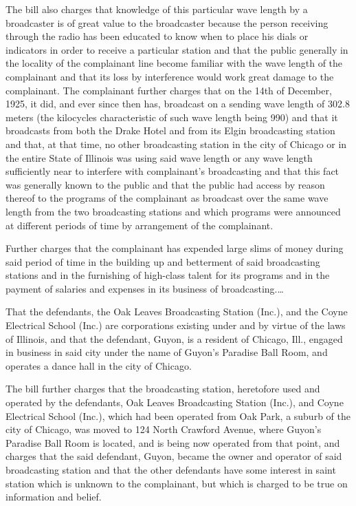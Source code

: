 The bill also charges that knowledge of this particular wave length by a
broadcaster is of great value to the broadcaster because the person receiving
through the radio has been educated to know when to place his dials or
indicators in order to receive a particular station and that the public
generally in the locality of the complainant line become familiar with the wave
length of the complainant and that its loss by interference would work great
damage to the complainant. The complainant further charges that on the 14th of
December, 1925, it did, and ever since then has, broadcast on a sending wave
length of 302.8 meters (the kilocycles characteristic of such wave length being
990) and that it broadcasts from both the Drake Hotel and from its Elgin
broadcasting station and that, at that time, no other broadcasting station in
the city of Chicago or in the entire State of Illinois was using said wave
length or any wave length sufficiently near to interfere with complainant's
broadcasting and that this fact was generally known to the public and that the
public had access by reason thereof to the programs of the complainant as
broadcast over the same wave length from the two broadcasting stations and
which programs were announced at different periods of time by arrangement of
the complainant.

Further charges that the complainant has expended large slims of money during
said period of time in the building up and betterment of said broadcasting
stations and in the furnishing of high-class talent for its programs and in the
payment of salaries and expenses in its business of broadcasting.\dots

That the defendants, the Oak Leaves Broadcasting Station (Inc.), and the Coyne
Electrical School (Inc.) are corporations existing under and by virtue of the
laws of Illinois, and that the defendant, Guyon, is a resident of Chicago,
Ill., engaged in business in said city under the name of Guyon's Paradise Ball
Room, and operates a dance hall in the city of Chicago.

The bill further charges that the broadcasting station, heretofore used and
operated by the defendants, Oak Leaves Broadcasting Station (Inc.), and Coyne
Electrical School (Inc.), which had been operated from Oak Park, a suburb of
the city of Chicago, was moved to 124 North Crawford Avenue, where Guyon's
Paradise Ball Room is located, and is being now operated from that point, and
charges that the said defendant, Guyon, became the owner and operator of said
broadcasting station and that the other defendants have some interest in saint
station which is unknown to the complainant, but which is charged to be true on
information and belief.

